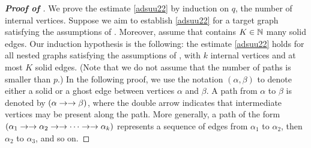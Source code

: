     


\begin{proof}[\bf Proof of ] 
We prove the estimate \eqref{adsuu22} by induction on $q$, the number of internal vertices. Suppose we aim to establish \eqref{adsuu22} for a target graph  satisfying the assumptions of . Moreover, assume that  contains $K\in \mathbb{N}$ many solid edges. Our induction hypothesis is the following: the estimate \eqref{adsuu22} holds for all nested graphs satisfying the assumptions of , with $k$ internal vertices and at most $K$ solid edges. (Note that we do not assume that the number of paths is smaller than $p$.)
In the following proof, we use the notation $(\alpha, \beta)$ to denote either a solid or a ghost edge between vertices $\alpha$ and $\beta$. A path from $\alpha$ to $\beta$ is denoted by $(\alpha \to \to \beta)$, where the double arrow indicates that intermediate vertices may be present along the path.
More generally, a path of the form
$(\alpha_1 \to \to \alpha_2 \to \to \cdots \to \to \alpha_k)$ represents a sequence of edges from $\alpha_1$ to $\alpha_2$, then $\alpha_2$ to $\alpha_3$, and so on.


\end{proof}
